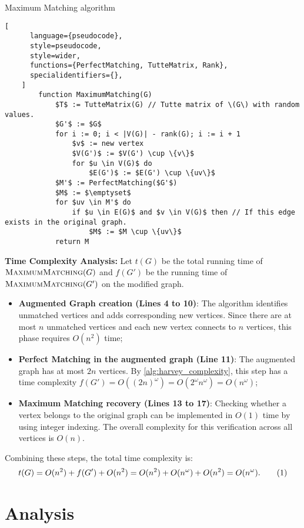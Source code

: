 \begin{programruledcaption}{Maximum Matching algorithm}
    \begin{lstlisting}[
      language={pseudocode},
      style=pseudocode,
      style=wider,
      functions={PerfectMatching, TutteMatrix, Rank},
      specialidentifiers={},
    ]
        function MaximumMatching(G)
            $T$ := TutteMatrix(G) // Tutte matrix of \(G\) with random values.
            $G'$ := $G$
            for i := 0; i < |V(G)| - rank(G); i := i + 1 
                $v$ := new vertex
                $V(G')$ := $V(G') \cup \{v\}$
                for $u \in V(G)$ do 
                    $E(G')$ := $E(G') \cup \{uv\}$
            $M'$ := PerfectMatching($G'$)
            $M$ := $\emptyset$
            for $uv \in M'$ do 
                if $u \in E(G)$ and $v \in V(G)$ then // If this edge exists in the original graph.
                    $M$ := $M \cup \{uv\}$
            return M
    \end{lstlisting}
\end{programruledcaption}
\noindent
\textbf{Time Complexity Analysis:} Let \(t(G)\) be the total running time of \(\textsc{MaximumMatching}(G)\) and \(f(G')\) be the running time of \(\textsc{MaximumMatching}(G')\) on the modified graph.
\begin{itemize}
\item \textbf{Augmented Graph creation (Lines 4 to 10)}:
The algorithm identifies unmatched vertices and adds corresponding new vertices. 
Since there are at most \(n\) unmatched vertices and each new vertex connects to \(n\) vertices, this phase requires \(O(n^2)\) time;

\item \textbf{Perfect Matching in the augmented graph (Line 11)}: 
The augmented graph has at most \(2n\) vertices. 
By \cref{alg:harvey_complexity}, this step has a time complexity  \(f(G') = O((2n)^\omega) = O(2^\omega n^\omega) = O(n^\omega)\);

\item \textbf{Maximum Matching recovery (Lines 13 to 17)}: 
Checking whether a vertex belongs to the original graph can be implemented in \(O(1)\) time by using integer indexing. 
The overall complexity for this verification across all vertices is \(O(n)\).
\end{itemize}
Combining these steps, the total time complexity is:
\[
t(G) = O(n^2) + f(G') + O(n^2) = O(n^2) + O(n^\omega) + O(n^2) = O(n^\omega). \numberthis \label{alg:maximum_matching_complexity}
\]

\section{Analysis}
